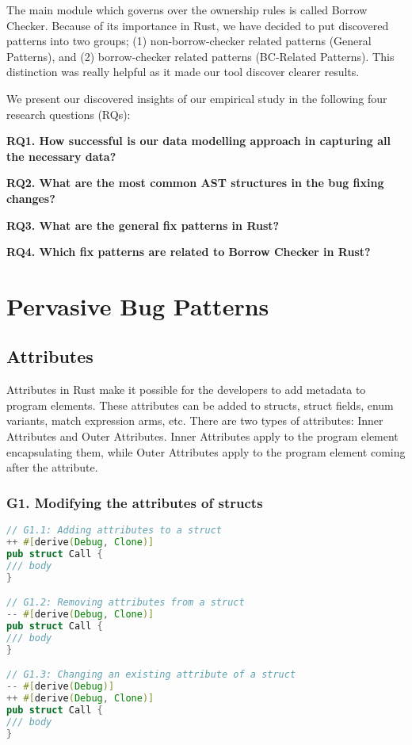 \documentclass{article}
\begin{document}
The main module which governs over the ownership rules is called Borrow Checker. Because of its importance in Rust, we have decided to put discovered patterns into two groups; (1) non-borrow-checker related patterns (General Patterns), and (2) borrow-checker related patterns (BC-Related Patterns). This distinction was really helpful as it made our tool discover clearer results.

We present our discovered insights of our empirical study in the following four research
questions (RQs):

\textbf{RQ1. How successful is our data modelling approach in capturing all the necessary data?} 

\textbf{RQ2. What are the most common AST structures in the bug fixing changes?} 

\textbf{RQ3. What are the general fix patterns in Rust?} 

\textbf{RQ4. Which fix patterns are related to Borrow Checker in Rust?}


\section{Pervasive Bug Patterns}
\subsection{Attributes}

Attributes in Rust make it possible for the developers to add metadata to program elements. These attributes can be added to structs, struct fields, enum variants, match expression arms, etc. There are two types of attributes: Inner Attributes and Outer Attributes. Inner Attributes apply to the program element encapsulating them, while Outer Attributes apply to the program element coming after the attribute.

\subsubsection{G1. Modifying the attributes of structs}

\begin{lstlisting}[language=Rust, style=colouredRust, label={l3}]
// G1.1: Adding attributes to a struct
++ #[derive(Debug, Clone)]
pub struct Call {
/// body 
}

// G1.2: Removing attributes from a struct
-- #[derive(Debug, Clone)]
pub struct Call {
/// body 
}

// G1.3: Changing an existing attribute of a struct
-- #[derive(Debug)]
++ #[derive(Debug, Clone)]
pub struct Call {
/// body 
}
\end{lstlisting}
\end{document}
